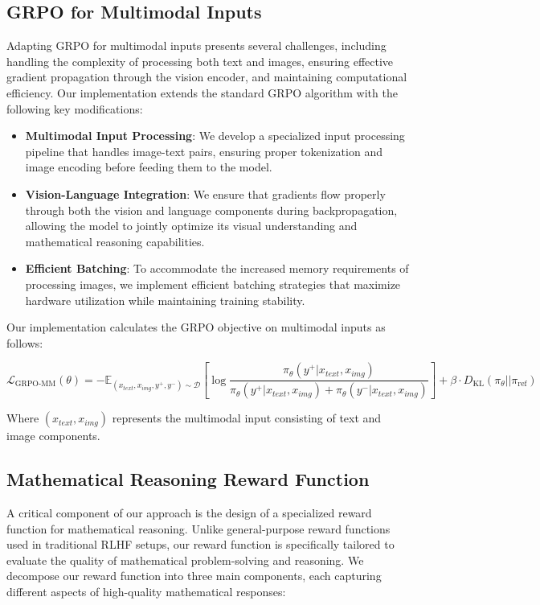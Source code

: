 \documentclass[11pt,a4paper]{article}
\begin{document}
\subsection{GRPO for Multimodal Inputs}

Adapting GRPO for multimodal inputs presents several challenges, including handling the complexity of processing both text and images, ensuring effective gradient propagation through the vision encoder, and maintaining computational efficiency. Our implementation extends the standard GRPO algorithm with the following key modifications:

\begin{itemize}
    \item \textbf{Multimodal Input Processing}: We develop a specialized input processing pipeline that handles image-text pairs, ensuring proper tokenization and image encoding before feeding them to the model.
    \item \textbf{Vision-Language Integration}: We ensure that gradients flow properly through both the vision and language components during backpropagation, allowing the model to jointly optimize its visual understanding and mathematical reasoning capabilities.
    \item \textbf{Efficient Batching}: To accommodate the increased memory requirements of processing images, we implement efficient batching strategies that maximize hardware utilization while maintaining training stability.
\end{itemize}

Our implementation calculates the GRPO objective on multimodal inputs as follows:

\begin{equation}
\mathcal{L}_{\text{GRPO-MM}}(\theta) = -\mathbb{E}_{(x_{text}, x_{img}, y^+, y^-) \sim \mathcal{D}} \left[ \log \frac{\pi_\theta(y^+ | x_{text}, x_{img})}{\pi_\theta(y^+ | x_{text}, x_{img}) + \pi_\theta(y^- | x_{text}, x_{img})} \right] + \beta \cdot D_{\text{KL}}(\pi_\theta || \pi_{\text{ref}})
\end{equation}

Where $(x_{text}, x_{img})$ represents the multimodal input consisting of text and image components.

\subsection{Mathematical Reasoning Reward Function}

A critical component of our approach is the design of a specialized reward function for mathematical reasoning. Unlike general-purpose reward functions used in traditional RLHF setups, our reward function is specifically tailored to evaluate the quality of mathematical problem-solving and reasoning. We decompose our reward function into three main components, each capturing different aspects of high-quality mathematical responses:
\end{document}
